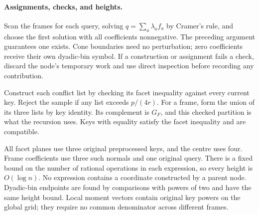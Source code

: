 \documentclass[notab,a4paper,UKenglish,numberwithinsect]{socg-lipics-v2021}
\begin{document}
\paragraph*{Assignments, checks, and heights.}
Scan the frames for each query, solving $q=\sum_a\lambda_af_a$ by Cramer's rule, and choose the first solution with all coefficients nonnegative. The preceding argument guarantees one exists. Cone boundaries need no perturbation; zero coefficients receive their own dyadic-bin symbol. If a construction or assignment fails a check, discard the node's temporary work and use direct inspection before recording any contribution.

Construct each conflict list by checking its facet inequality against every current key. Reject the sample if any list exceeds $p/(4r)$. For a frame, form the union of its three lists by key identity. Its complement is $G_F$, and this checked partition is what the recursion uses. Keys with equality satisfy the facet inequality and are compatible.

All facet planes use three original preprocessed keys, and the centre uses four. Frame coefficients use three such normals and one original query. There is a fixed bound on the number of rational operations in each expression, so every height is $O(\log n)$. No expression contains a coordinate constructed by a parent node. Dyadic-bin endpoints are found by comparisons with powers of two and have the same height bound. Local moment vectors contain original key powers on the global grid; they require no common denominator across different frames.

\end{document}
